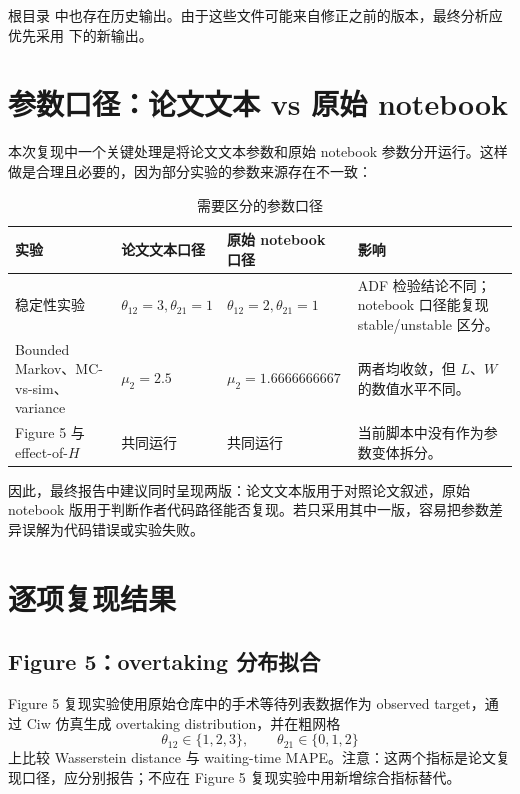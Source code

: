 \documentclass[UTF8,a4paper,11pt]{ctexart}
\begin{document}
根目录  中也存在历史输出。由于这些文件可能来自修正之前的版本，最终分析应优先采用  下的新输出。

\section{参数口径：论文文本 vs 原始 notebook}

本次复现中一个关键处理是将论文文本参数和原始 notebook 参数分开运行。这样做是合理且必要的，因为部分实验的参数来源存在不一致：

\begin{table}[H]
\centering
\caption{需要区分的参数口径}
\begin{tabularx}{\textwidth}{@{}p{}p{}p{}X@{}}
\toprule
实验 & 论文文本口径 & 原始 notebook 口径 & 影响 \\
\midrule
稳定性实验 & $\theta_{12}=3,\theta_{21}=1$ & $\theta_{12}=2,\theta_{21}=1$ & ADF 检验结论不同；notebook 口径能复现 stable/unstable 区分。\\
Bounded Markov、MC-vs-sim、variance & $\mu_2=2.5$ & $\mu_2=1.6666666667$ & 两者均收敛，但 $L$、$W$ 的数值水平不同。\\
Figure 5 与 effect-of-$H$ & 共同运行 & 共同运行 & 当前脚本中没有作为参数变体拆分。\\
\bottomrule
\end{tabularx}
\end{table}

因此，最终报告中建议同时呈现两版：论文文本版用于对照论文叙述，原始 notebook 版用于判断作者代码路径能否复现。若只采用其中一版，容易把参数差异误解为代码错误或实验失败。

\section{逐项复现结果}

\subsection{Figure 5：overtaking 分布拟合}

Figure 5 复现实验使用原始仓库中的手术等待列表数据作为 observed target，通过 Ciw 仿真生成 overtaking distribution，并在粗网格
\[
  \theta_{12}\in\{1,2,3\},\qquad \theta_{21}\in\{0,1,2\}
\]
上比较 Wasserstein distance 与 waiting-time MAPE。注意：这两个指标是论文复现口径，应分别报告；不应在 Figure 5 复现实验中用新增综合指标替代。
\end{document}
